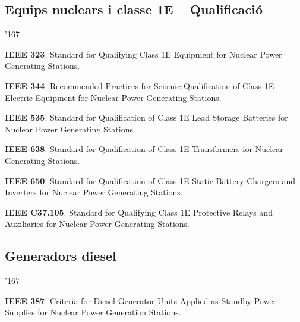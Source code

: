 \subsection*{Equips nuclears i classe 1E -- Qualificaci\'{o}}
\begin{dinglist}{'167}
    \item \textbf{IEEE 323}. Standard for Qualifying Class 1E Equipment for Nuclear Power Generating Stations.
    \item \textbf{IEEE 344}. Recommended Practices for Seismic Qualification of Class 1E Electric Equipment for Nuclear Power Generating Stations.
    \item \textbf{IEEE 535}.  Standard for Qualification of Class 1E Lead Storage Batteries for Nuclear Power Generating Stations. 
    \item \textbf{IEEE 638}. Standard for Qualification of Class 1E Transformers for Nuclear Generating Stations.
    \item \textbf{IEEE 650}. Standard for Qualification of Class 1E Static Battery Chargers and Inverters for Nuclear Power Generating Stations.
    \item \textbf{IEEE C37.105}. Standard for Qualifying Class 1E Protective Relays and Auxiliaries for Nuclear Power Generating Stations.
\end{dinglist}


\subsection*{Generadors diesel}
\begin{dinglist}{'167}
    \item \textbf{IEEE 387}. Criteria for Diesel-Generator Units Applied as Standby Power Supplies for Nuclear Power Generation Stations.
\end{dinglist}


